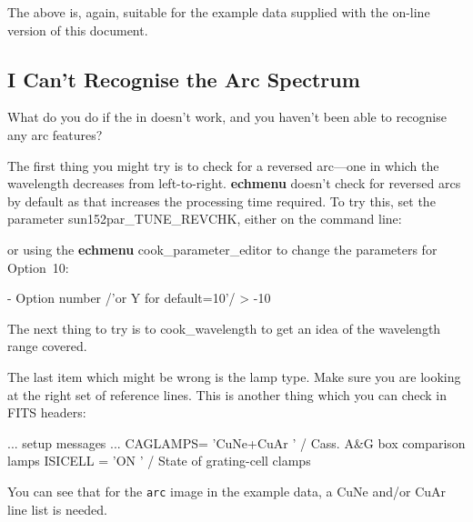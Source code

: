 \documentclass[twoside,11pt]{starlink}
\providecommand{\mlabel}[1]{\xlabel{#1}\label{#1}}
\providecommand{\scspec}[2]{#1}
\begin{document}
The above is, again, suitable for the example data supplied with the
on-line version of this document.


\subsection{\mlabel{cook_arc_reverse}I Can't Recognise the Arc Spectrum}

What do you do if the
 in
 doesn't work, and you haven't been
able to recognise any arc features?

The first thing you might try is to check for a reversed
arc\scspec{---}{ - }one in which the wavelength decreases from left-to-right.
\textbf{echmenu} doesn't check for reversed arcs by default as that increases
the processing time required.
To try this, set the parameter 
{sun152}{par_TUNE_REVCHK}, either on the command line:

{
\scspec{\small}{ }
\begin{terminalv}
\end{terminalv}
}

or using the \textbf{echmenu} 
{cook_parameter_editor} to change the parameters for Option~10:

{
\scspec{\small}{ }
\begin{terminalv}
    - Option number /'or Y for default=10'/ > -10
\end{terminalv}
}

The next thing to try is to 
{cook_wavelength} to get an idea of the wavelength range covered.

The last item which might be wrong is the lamp type.  Make sure you are
looking at the right set of reference lines.  This is another thing which
you can check in FITS headers:

{
\scspec{\small}{ }
\begin{terminalv}
   ... setup messages ...
   CAGLAMPS= 'CuNe+CuAr         ' / Cass. A&G box comparison lamps
   ISICELL = 'ON                ' / State of grating-cell clamps
\end{terminalv}
}

You can see that for the \verb+arc+ image in the example data, a
CuNe and/or CuAr line list is needed.
\end{document}
